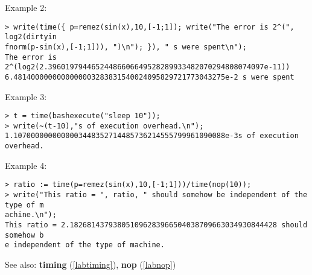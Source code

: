 \noindent Example 2: 
\begin{center}\begin{minipage}{15cm}\begin{Verbatim}[frame=single]
> write(time({ p=remez(sin(x),10,[-1;1]); write("The error is 2^(", log2(dirtyin
fnorm(p-sin(x),[-1;1])), ")\n"); }), " s were spent\n");
The error is 2^(log2(2.39601979446524486606649528289933482070294808074097e-11))
6.4814000000000000003283831540024095829721773043275e-2 s were spent
\end{Verbatim}
\end{minipage}\end{center}
\noindent Example 3: 
\begin{center}\begin{minipage}{15cm}\begin{Verbatim}[frame=single]
> t = time(bashexecute("sleep 10"));
> write(~(t-10),"s of execution overhead.\n");
1.1070000000000003448352714485736214555799961090088e-3s of execution overhead.
\end{Verbatim}
\end{minipage}\end{center}
\noindent Example 4: 
\begin{center}\begin{minipage}{15cm}\begin{Verbatim}[frame=single]
> ratio := time(p=remez(sin(x),10,[-1;1]))/time(nop(10));
> write("This ratio = ", ratio, " should somehow be independent of the type of m
achine.\n");
This ratio = 2.182681437938051096283966504038709663034930844428 should somehow b
e independent of the type of machine.
\end{Verbatim}
\end{minipage}\end{center}
See also: \textbf{timing} (\ref{labtiming}), \textbf{nop} (\ref{labnop})
